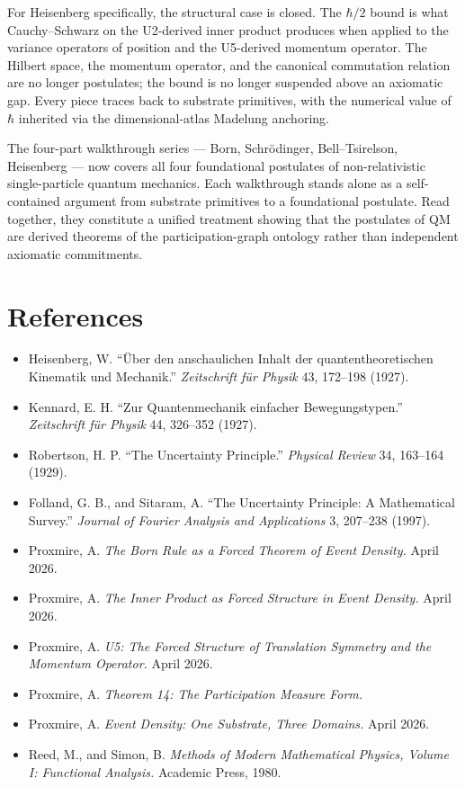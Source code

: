 \documentclass[11pt,a4paper]{article}
\begin{document}
For Heisenberg specifically, the structural case is closed. The $\hbar/2$ bound is what Cauchy--Schwarz on the U2-derived inner product produces when applied to the variance operators of position and the U5-derived momentum operator. The Hilbert space, the momentum operator, and the canonical commutation relation are no longer postulates; the bound is no longer suspended above an axiomatic gap. Every piece traces back to substrate primitives, with the numerical value of $\hbar$ inherited via the dimensional-atlas Madelung anchoring.

The four-part walkthrough series --- Born, Schr\"odinger, Bell--Tsirelson, Heisenberg --- now covers all four foundational postulates of non-relativistic single-particle quantum mechanics. Each walkthrough stands alone as a self-contained argument from substrate primitives to a foundational postulate. Read together, they constitute a unified treatment showing that the postulates of QM are derived theorems of the participation-graph ontology rather than independent axiomatic commitments.

\section*{References}

\begin{itemize}[leftmargin=*,itemsep=2pt]
  \item Heisenberg, W. ``\"Uber den anschaulichen Inhalt der quantentheoretischen Kinematik und Mechanik.'' \emph{Zeitschrift f\"ur Physik} 43, 172--198 (1927).
  \item Kennard, E. H. ``Zur Quantenmechanik einfacher Bewegungstypen.'' \emph{Zeitschrift f\"ur Physik} 44, 326--352 (1927).
  \item Robertson, H. P. ``The Uncertainty Principle.'' \emph{Physical Review} 34, 163--164 (1929).
  \item Folland, G. B., and Sitaram, A. ``The Uncertainty Principle: A Mathematical Survey.'' \emph{Journal of Fourier Analysis and Applications} 3, 207--238 (1997).
  \item Proxmire, A. \emph{The Born Rule as a Forced Theorem of Event Density.} April 2026.
  \item Proxmire, A. \emph{The Inner Product as Forced Structure in Event Density.} April 2026.
  \item Proxmire, A. \emph{U5: The Forced Structure of Translation Symmetry and the Momentum Operator.} April 2026.
  \item Proxmire, A. \emph{Theorem 14: The Participation Measure Form.}
  \item Proxmire, A. \emph{Event Density: One Substrate, Three Domains.} April 2026.
  \item Reed, M., and Simon, B. \emph{Methods of Modern Mathematical Physics, Volume I: Functional Analysis.} Academic Press, 1980.
\end{itemize}
\end{document}
